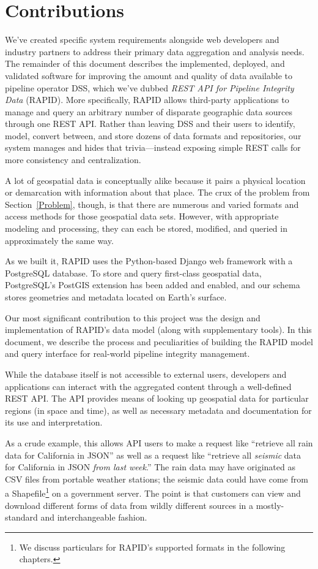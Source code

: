 \section{Contributions}
We've created specific system requirements alongside web developers and industry partners to address their primary data aggregation and analysis needs. The remainder of this document describes the implemented, deployed, and validated software for improving the amount and quality of data available to pipeline operator DSS, which we've dubbed \textit{REST API for Pipeline Integrity Data} (RAPID). More specifically, RAPID allows third-party applications to manage and query an arbitrary number of disparate geographic data sources through one REST API. Rather than leaving DSS and their users to identify, model, convert between, and store dozens of data formats and repositories, our system manages and hides that trivia---instead exposing simple REST calls for more consistency and centralization.

A lot of geospatial data is conceptually alike because it pairs a physical location or demarcation with information about that place. The crux of the problem from Section~\ref{Problem}, though, is that there are numerous and varied formats and access methods for those geospatial data sets. However, with appropriate modeling and processing, they can each be stored, modified, and queried in approximately the same way.

As we built it, RAPID uses the Python-based Django web framework with a PostgreSQL database. To store and query first-class geospatial data, PostgreSQL's PostGIS extension has been added and enabled, and our schema stores geometries and metadata located on Earth's surface.

Our most significant contribution to this project was the design and implementation of RAPID's data model (along with supplementary tools). In this document, we describe the process and peculiarities of building the RAPID model and query interface for real-world pipeline integrity management.

While the database itself is not accessible to external users, developers and applications can interact with the aggregated content through a well-defined REST API. The API provides means of looking up geospatial data for particular regions (in space and time), as well as necessary metadata and documentation for its use and interpretation.

As a crude example, this allows API users to make a request like ``retrieve all rain data for California in JSON'' as well as a request like ``retrieve all \textit{seismic} data for California in JSON \textit{from last week}.'' The rain data may have originated as CSV files from portable weather stations; the seismic data could have come from a Shapefile\footnote{We discuss particulars for RAPID's supported formats in the following chapters.} on a government server. The point is that customers can view and download different forms of data from wildly different sources in a mostly-standard and interchangeable fashion.

